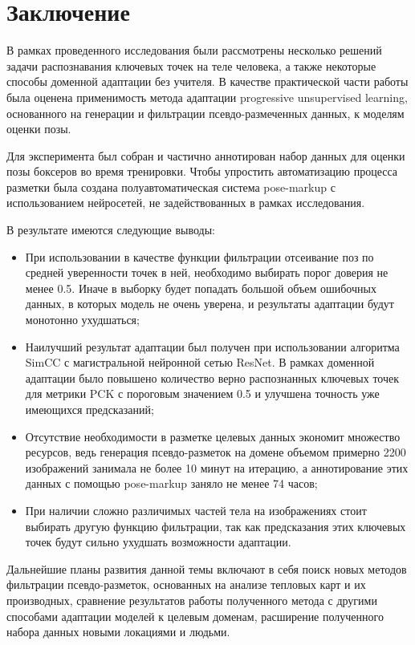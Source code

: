 \section{Заключение}
\label{sec:Chapter6} 


В рамках проведенного исследования были рассмотрены несколько решений задачи распознавания ключевых точек на теле человека, а также некоторые способы доменной адаптации без учителя. В качестве практической части работы была оценена применимость метода адаптации progressive unsupervised learning, основанного на генерации и фильтрации псевдо-размеченных данных, к моделям оценки позы. 

Для эксперимента был собран и частично аннотирован набор данных для оценки позы боксеров во время тренировки. Чтобы упростить автоматизацию процесса разметки была создана полуавтоматическая система pose-markup с использованием нейросетей, не задействованных в рамках исследования.

В результате имеются следующие выводы:

\begin{itemize}
\item При использовании в качестве функции фильтрации отсеивание поз по средней уверенности точек в ней, необходимо выбирать порог доверия не менее 0.5. Иначе в выборку будет попадать большой объем ошибочных данных, в которых модель не очень уверена, и результаты адаптации будут монотонно ухудшаться;
\item Наилучший результат адаптации был получен при использовании алгоритма SimCC  с магистральной нейронной сетью ResNet. В рамках доменной адаптации было повышено количество верно распознанных ключевых точек для метрики PCK с пороговым значением 0.5 и улучшена точность уже имеющихся предсказаний;
\item Отсутствие необходимости в разметке целевых данных экономит множество ресурсов, ведь генерация псевдо-разметок на домене объемом примерно 2200 изображений занимала не более 10 минут на итерацию, а аннотирование этих данных с помощью pose-markup заняло не менее 74 часов;
\item При наличии сложно различимых частей тела на изображениях стоит выбирать другую функцию фильтрации, так как предсказания этих ключевых точек будут сильно ухудшать возможности адаптации.
\end{itemize}

Дальнейшие планы развития данной темы включают в себя поиск новых методов фильтрации псевдо-разметок, основанных на анализе тепловых карт и их производных, сравнение результатов работы полученного метода с другими способами адаптации моделей к целевым доменам, расширение полученного набора данных новыми локациями и людьми.

\newpage